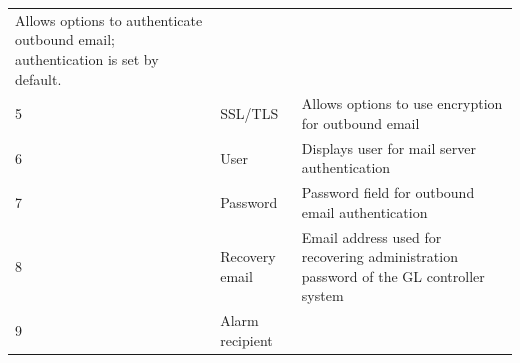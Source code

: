 \begin{longtable}[]{@{}lll@{}}
\begin{minipage}[t]{0.49\columnwidth}
Allows options to authenticate outbound email; authentication is set by
default.\strut
\end{minipage}\tabularnewline
\begin{minipage}[t]{0.19\columnwidth}\raggedright
5\strut
\end{minipage} & \begin{minipage}[t]{0.23\columnwidth}\raggedright
SSL/TLS\strut
\end{minipage} & \begin{minipage}[t]{0.49\columnwidth}\raggedright
Allows options to use encryption for outbound email\strut
\end{minipage}\tabularnewline
\begin{minipage}[t]{0.19\columnwidth}\raggedright
6\strut
\end{minipage} & \begin{minipage}[t]{0.23\columnwidth}\raggedright
User\strut
\end{minipage} & \begin{minipage}[t]{0.49\columnwidth}\raggedright
Displays user for mail server authentication\strut
\end{minipage}\tabularnewline
\begin{minipage}[t]{0.19\columnwidth}\raggedright
7\strut
\end{minipage} & \begin{minipage}[t]{0.23\columnwidth}\raggedright
Password\strut
\end{minipage} & \begin{minipage}[t]{0.49\columnwidth}\raggedright
Password field for outbound email authentication\strut
\end{minipage}\tabularnewline
\begin{minipage}[t]{0.19\columnwidth}\raggedright
8\strut
\end{minipage} & \begin{minipage}[t]{0.23\columnwidth}\raggedright
Recovery email\strut
\end{minipage} & \begin{minipage}[t]{0.49\columnwidth}\raggedright
Email address used for recovering administration password of the GL
controller system\strut
\end{minipage}\tabularnewline
\begin{minipage}[t]{0.19\columnwidth}\raggedright
9\strut
\end{minipage} & \begin{minipage}[t]{0.23\columnwidth}\raggedright
Alarm recipient\strut
\end{minipage} & \begin{minipage}[t]{0.49\columnwidth}\raggedright

\end{minipage}
\end{longtable}
